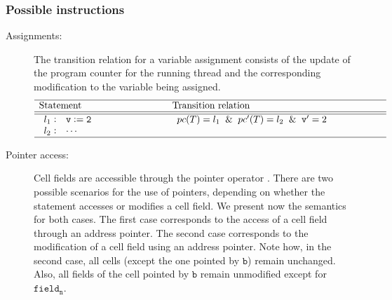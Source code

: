 \subsubsection{Possible instructions}
\begin{description}
\item [Assignments:]
		The transition relation for a variable assignment consists of the 
		update of the program counter for the running thread and the 
		corresponding modification to the variable being assigned.
\[
\begin{array}[t]{p{8em}@{\hspace{6em}}p{\longtablesize}}
	\hline
	Statement & Transition relation \\ \hline\hline
	$\begin{array}[t]{l@{\hspace{0.3em}}c@{\hspace{1em}}l}
		l_1 & : & \mathtt{v := 2} \\
		l_2 & : & \mathtt{\cdots}
	\end{array}$
	&
	$\begin{array}[t]{ll}
		 \pc(T) = l_1 \And
		 \pc'(T) = l_2 \And
		 \mathtt{v}' = 2
	 \end{array}$ \\ 
	 \hline
\end{array}
\]

	\item [Pointer access:]
		Cell fields are accessible through the pointer operator \pointsto.
%
		There are two possible scenarios for the use of pointers, depending on 
		whether the statement accesses or modifies a cell field.
%
		We present now the semantics for both cases.
%
		The first case corresponds to the access of a cell field through an 
		address pointer.
%
		The second case corresponds to the modification of a cell field using 
		an address pointer.
%
		Note how, in the second case, all cells (except the one pointed by 
		$\mathtt{b}$) remain unchanged.
%
		Also, all fields of the cell pointed by $\mathtt{b}$ remain unmodified 
		except for $\mathtt{field_n}$.



\end{description}
